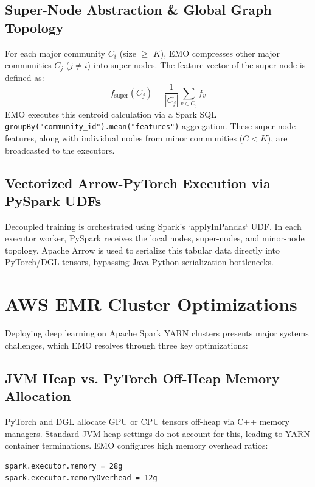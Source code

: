 \documentclass[conference,compsoc]{IEEEtran}
\begin{document}
\subsection{Super-Node Abstraction \& Global Graph Topology}
For each major community $C_i$ (size $\ge$ $K$), EMO compresses other major communities $C_j$ ($j \neq i$) into super-nodes. The feature vector of the super-node is defined as:
\begin{equation}
f_{\text{super}}(C_j) = \frac{1}{|C_j|} \sum_{v \in C_j} f_v
\end{equation}
EMO executes this centroid calculation via a Spark SQL \verb|groupBy("community_id").mean("features")| aggregation. These super-node features, along with individual nodes from minor communities ($C < K$), are broadcasted to the executors.

\subsection{Vectorized Arrow-PyTorch Execution via PySpark UDFs}
Decoupled training is orchestrated using Spark's `applyInPandas` UDF. In each executor worker, PySpark receives the local nodes, super-nodes, and minor-node topology. Apache Arrow is used to serialize this tabular data directly into PyTorch/DGL tensors, bypassing Java-Python serialization bottlenecks.

\section{AWS EMR Cluster Optimizations}
Deploying deep learning on Apache Spark YARN clusters presents major systems challenges, which EMO resolves through three key optimizations:

\subsection{JVM Heap vs. PyTorch Off-Heap Memory Allocation}
PyTorch and DGL allocate GPU or CPU tensors off-heap via C++ memory managers. Standard JVM heap settings do not account for this, leading to YARN container terminations. EMO configures high memory overhead ratios:
\begin{lstlisting}[basicstyle=\footnotesize\ttfamily,columns=fullflexible]
spark.executor.memory = 28g
spark.executor.memoryOverhead = 12g
\end{lstlisting}
\end{document}
